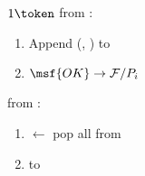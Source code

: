 \begin{bbox}[title={\textbf{Wrapper} $\Wasync$} ]
\begin{enumerate}
	\end{enumerate}

\OnInput {} \color{red} $1 \token$ \color{black} from \F:
	\begin{enumerate}
		\item Append (\F, ) to 
		\item \Send $\msf{OK} \rightarrow \mathcal{F}/P_i$ 
	\end{enumerate}

\OnInput {} from \Adversary:
	\begin{enumerate}
		\item {} $\leftarrow$ pop all from 
		\item \Send {} to \Adversary
	\end{enumerate}
\end{bbox}
